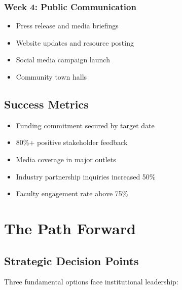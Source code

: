 \documentclass{article}
\begin{document}
\subsubsection{Week 4: Public Communication}
\begin{itemize}
\item Press release and media briefings
\item Website updates and resource posting
\item Social media campaign launch
\item Community town halls
\end{itemize}

\subsection{Success Metrics}

\begin{itemize}
\item Funding commitment secured by target date
\item 80\%+ positive stakeholder feedback
\item Media coverage in major outlets
\item Industry partnership inquiries increased 50\%
\item Faculty engagement rate above 75\%
\end{itemize}

\section{The Path Forward}

\subsection{Strategic Decision Points}

Three fundamental options face institutional leadership:
\end{document}
